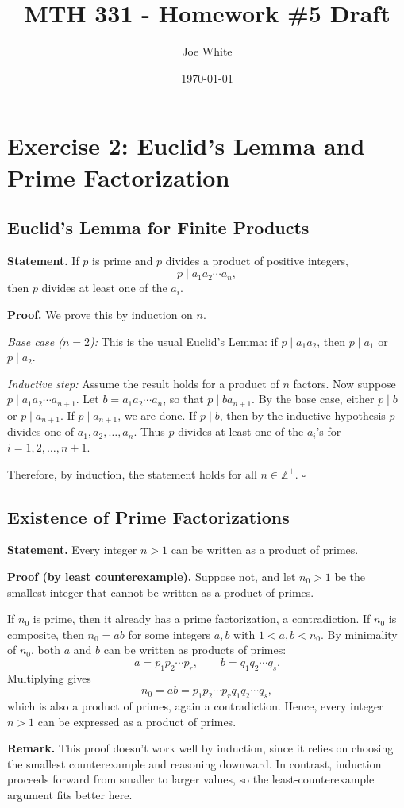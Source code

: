 \documentclass[11pt]{article}
\title{MTH 331 - Homework \#5 Draft}
\author{Joe White}
\date{\today}
\begin{document}
\maketitle

\section*{Exercise 2: Euclid’s Lemma and Prime Factorization}

\subsection*{Euclid’s Lemma for Finite Products}

\textbf{Statement.}  
If $p$ is prime and $p$ divides a product of positive integers,
\[
p \mid a_1 a_2 \cdots a_n,
\]
then $p$ divides at least one of the $a_i$.

\textbf{Proof.}  
We prove this by induction on $n$.

\emph{Base case ($n=2$):}  
This is the usual Euclid’s Lemma: if $p \mid a_1 a_2$, then $p \mid a_1$ or $p \mid a_2$.

\emph{Inductive step:}  
Assume the result holds for a product of $n$ factors.  
Now suppose $p \mid a_1 a_2 \cdots a_{n+1}$.  
Let $b = a_1 a_2 \cdots a_n$, so that $p \mid b a_{n+1}$.  
By the base case, either $p \mid b$ or $p \mid a_{n+1}$.  
If $p \mid a_{n+1}$, we are done.  
If $p \mid b$, then by the inductive hypothesis $p$ divides one of $a_1, a_2, \ldots, a_n$.  
Thus $p$ divides at least one of the $a_i$’s for $i = 1, 2, \ldots, n+1$.  

Therefore, by induction, the statement holds for all $n \in \mathbb{Z}^+$.  
\hfill $\square$

\bigskip
\subsection*{Existence of Prime Factorizations}

\textbf{Statement.}  
Every integer $n > 1$ can be written as a product of primes.

\textbf{Proof (by least counterexample).}  
Suppose not, and let $n_0 > 1$ be the smallest integer that cannot be written as a product of primes.  

If $n_0$ is prime, then it already has a prime factorization, a contradiction.  
If $n_0$ is composite, then $n_0 = ab$ for some integers $a,b$ with $1 < a,b < n_0$.  
By minimality of $n_0$, both $a$ and $b$ can be written as products of primes:
\[
a = p_1 p_2 \cdots p_r, \qquad b = q_1 q_2 \cdots q_s.
\]
Multiplying gives
\[
n_0 = ab = p_1 p_2 \cdots p_r q_1 q_2 \cdots q_s,
\]
which is also a product of primes, again a contradiction.  
Hence, every integer $n > 1$ can be expressed as a product of primes.  

\textbf{Remark.}  
This proof doesn’t work well by induction, since it relies on choosing the smallest counterexample and reasoning downward.  
In contrast, induction proceeds forward from smaller to larger values, so the least-counterexample argument fits better here.
 
\end{document}
